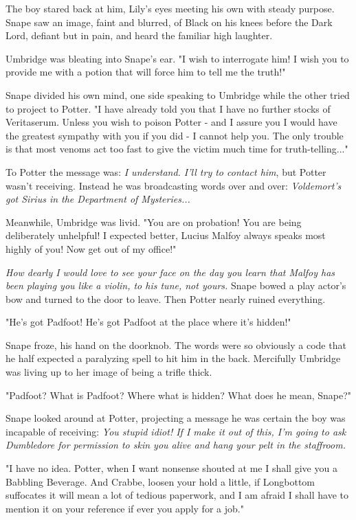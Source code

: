 The boy stared back at him, Lily's eyes meeting his own with steady purpose. Snape saw an image, faint and blurred, of Black on his knees before the Dark Lord, defiant but in pain, and heard the familiar high laughter.

Umbridge was bleating into Snape's ear. "I wish to interrogate him! I wish you to provide me with a potion that will force him to tell me the truth!"

Snape divided his own mind, one side speaking to Umbridge while the other tried to project to Potter. "I have already told you that I have no further stocks of Veritaserum. Unless you wish to poison Potter - and I assure you I would have the greatest sympathy with you if you did - I cannot help you. The only trouble is that most venoms act too fast to give the victim much time for truth-telling..."

To Potter the message was: \emph{I understand. I'll try to contact him}, but Potter wasn't receiving. Instead he was broadcasting words over and over: \emph{Voldemort's got Sirius in the Department of Mysteries...}

Meanwhile, Umbridge was livid. "You are on probation! You are being deliberately unhelpful! I expected better, Lucius Malfoy always speaks most highly of you! Now get out of my office!"

\emph{How dearly I would love to see your face on the day you learn that Malfoy has been playing you like a violin, to his tune, not yours.} Snape bowed a play actor's bow and turned to the door to leave. Then Potter nearly ruined everything.

"He's got Padfoot! He's got Padfoot at the place where it's hidden!"

Snape froze, his hand on the doorknob. The words were so obviously a code that he half expected a paralyzing spell to hit him in the back. Mercifully Umbridge was living up to her image of being a trifle thick.

"Padfoot? What is Padfoot? Where what is hidden? What does he mean, Snape?"

Snape looked around at Potter, projecting a message he was certain the boy was incapable of receiving: \emph{You stupid idiot! If I make it out of this, I'm going to ask Dumbledore for permission to skin you alive and hang your pelt in the staffroom.}

"I have no idea. Potter, when I want nonsense shouted at me I shall give you a Babbling Beverage. And Crabbe, loosen your hold a little, if Longbottom suffocates it will mean a lot of tedious paperwork, and I am afraid I shall have to mention it on your reference if ever you apply for a job."

